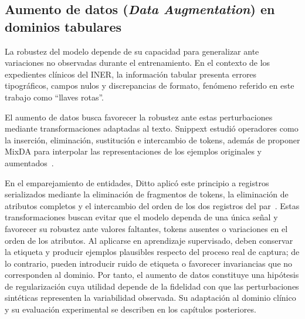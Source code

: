 \subsection{Aumento de datos (\textit{Data Augmentation}) en dominios tabulares}
La robustez del modelo depende de su capacidad para generalizar ante variaciones no observadas durante el entrenamiento. En el contexto de los expedientes clínicos del INER, la información tabular presenta errores tipográficos, campos nulos y discrepancias de formato, fenómeno referido en este trabajo como ``llaves rotas''.

El aumento de datos busca favorecer la robustez ante estas perturbaciones mediante transformaciones adaptadas al texto. Snippext estudió operadores como la inserción, eliminación, sustitución e intercambio de tokens, además de proponer MixDA para interpolar las representaciones de los ejemplos originales y aumentados~\cite{miao2020}.

En el emparejamiento de entidades, Ditto aplicó este principio a registros serializados mediante la eliminación de fragmentos de tokens, la eliminación de atributos completos y el intercambio del orden de los dos registros del par~\cite{li2020}. Estas transformaciones buscan evitar que el modelo dependa de una única señal y favorecer su robustez ante valores faltantes, tokens ausentes o variaciones en el orden de los atributos. Al aplicarse en aprendizaje supervisado, deben conservar la etiqueta y producir ejemplos plausibles respecto del proceso real de captura; de lo contrario, pueden introducir ruido de etiqueta o favorecer invariancias que no corresponden al dominio. Por tanto, el aumento de datos constituye una hipótesis de regularización cuya utilidad depende de la fidelidad con que las perturbaciones sintéticas representen la variabilidad observada. Su adaptación al dominio clínico y su evaluación experimental se describen en los capítulos posteriores.
